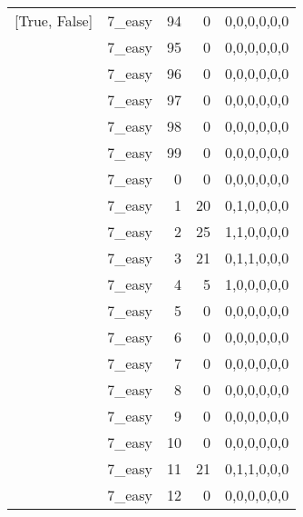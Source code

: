 \begin{tabular}{llrrl}
 [True, False]   & 7\_easy              &            94 &                     0 & 0,0,0,0,0,0   \\
 [True, False]   & 7\_easy              &            95 &                     0 & 0,0,0,0,0,0   \\
 [True, False]   & 7\_easy              &            96 &                     0 & 0,0,0,0,0,0   \\
 [True, False]   & 7\_easy              &            97 &                     0 & 0,0,0,0,0,0   \\
 [True, False]   & 7\_easy              &            98 &                     0 & 0,0,0,0,0,0   \\
 [True, False]   & 7\_easy              &            99 &                     0 & 0,0,0,0,0,0   \\
 [True, False]   & 7\_easy              &             0 &                     0 & 0,0,0,0,0,0   \\
 [True, False]   & 7\_easy              &             1 &                    20 & 0,1,0,0,0,0   \\
 [True, False]   & 7\_easy              &             2 &                    25 & 1,1,0,0,0,0   \\
 [True, False]   & 7\_easy              &             3 &                    21 & 0,1,1,0,0,0   \\
 [True, False]   & 7\_easy              &             4 &                     5 & 1,0,0,0,0,0   \\
 [True, False]   & 7\_easy              &             5 &                     0 & 0,0,0,0,0,0   \\
 [True, False]   & 7\_easy              &             6 &                     0 & 0,0,0,0,0,0   \\
 [True, False]   & 7\_easy              &             7 &                     0 & 0,0,0,0,0,0   \\
 [True, False]   & 7\_easy              &             8 &                     0 & 0,0,0,0,0,0   \\
 [True, False]   & 7\_easy              &             9 &                     0 & 0,0,0,0,0,0   \\
 [True, False]   & 7\_easy              &            10 &                     0 & 0,0,0,0,0,0   \\
 [True, False]   & 7\_easy              &            11 &                    21 & 0,1,1,0,0,0   \\
 [True, False]   & 7\_easy              &            12 &                     0 & 0,0,0,0,0,0   \\

\end{tabular}
